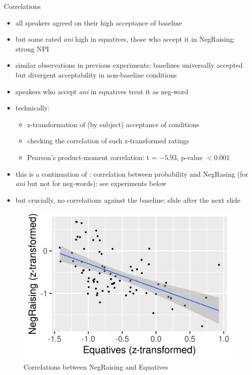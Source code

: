 \documentclass[
  ignorenonframetext,
]{beamer}
\providecommand{\tightlist}{%
  \setlength{\itemsep}{0pt}\setlength{\parskip}{0pt}}
\begin{document}
\begin{frame}
\begin{block}{Correlations}
\protect\hypertarget{correlations}{}
\begin{itemize}
\tightlist
\item
  all speakers agreed on their high acceptance of baseline
\item
  but some rated \emph{ani} high in equatives, those who accept it in
  NegRaising: strong NPI
\item
  similar observations in previous experiments: baselines universally
  accepted but divergent acceptability in non-baseline conditions
\item
  speakers who accept \emph{ani} in equatives treat it as neg-word
\item
  technically:

  \begin{itemize}
  \tightlist
  \item
    z-transformation of (by subject) acceptance of conditions
  \item
    checking the correlation of such z-transformed ratings
  \item
    Pearson's product-moment correlation: t = \(-5.93\), p-value
    \(< 0.001\)
  \end{itemize}
\item
  this is a continuation of \citet{docekaldotlacilsubber}: correlation
  between probability and NegRasing (for \emph{ani} but not for
  neg-words): see experiments below
\item
  but crucially, no correlations against the baseline: slide after the
  next slide
\end{itemize}
\end{block}
\end{frame}

\begin{frame}
\begin{figure}
\centering
\includegraphics{"correlations_ani.png"}
\caption{Correlations between NegRaising and Equatives}
\end{figure}
\end{frame}
\end{document}
